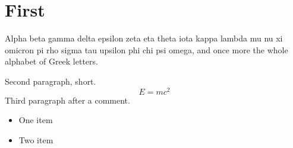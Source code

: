 \documentclass{article}
\begin{document}
\section{First}
Alpha beta gamma delta epsilon zeta eta theta iota kappa lambda mu nu xi omicron pi rho
sigma tau upsilon phi chi psi omega, and once more the whole alphabet of Greek letters.

Second paragraph, short.
\[ E = mc^2 \]
Third paragraph after a comment.
\begin{itemize}
\item One item
\item Two item
\end{itemize}
\end{document}
